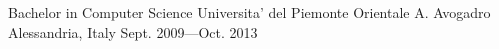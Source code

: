 

\begin{cventries}

  \cventry
  {Bachelor in Computer Science} %
  {Universita' del Piemonte Orientale A. Avogadro} %
  {Alessandria, Italy} %
  {Sept. 2009—Oct. 2013} %
  {
  }

\end{cventries}
